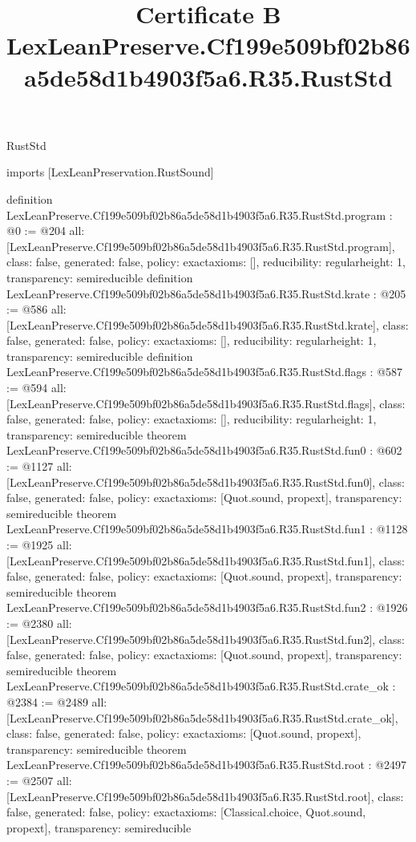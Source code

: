 \begin{lexlean}{RustStd}
\title{Certificate B LexLeanPreserve.Cf199e509bf02b86a5de58d1b4903f5a6.R35.RustStd}
\begin{coremodule}
imports [LexLeanPreservation.RustSound]

definition LexLeanPreserve.Cf199e509bf02b86a5de58d1b4903f5a6.R35.RustStd.program : @0 := @204 {
  all: [LexLeanPreserve.Cf199e509bf02b86a5de58d1b4903f5a6.R35.RustStd.program],
  class: false,
  generated: false,
  policy: exact{axioms: []},
  reducibility: regular{height: 1},
  transparency: semireducible
}
definition LexLeanPreserve.Cf199e509bf02b86a5de58d1b4903f5a6.R35.RustStd.krate : @205 := @586 {
  all: [LexLeanPreserve.Cf199e509bf02b86a5de58d1b4903f5a6.R35.RustStd.krate],
  class: false,
  generated: false,
  policy: exact{axioms: []},
  reducibility: regular{height: 1},
  transparency: semireducible
}
definition LexLeanPreserve.Cf199e509bf02b86a5de58d1b4903f5a6.R35.RustStd.flags : @587 := @594 {
  all: [LexLeanPreserve.Cf199e509bf02b86a5de58d1b4903f5a6.R35.RustStd.flags],
  class: false,
  generated: false,
  policy: exact{axioms: []},
  reducibility: regular{height: 1},
  transparency: semireducible
}
theorem LexLeanPreserve.Cf199e509bf02b86a5de58d1b4903f5a6.R35.RustStd.fun0 : @602 := @1127 {
  all: [LexLeanPreserve.Cf199e509bf02b86a5de58d1b4903f5a6.R35.RustStd.fun0],
  class: false,
  generated: false,
  policy: exact{axioms: [Quot.sound, propext]},
  transparency: semireducible
}
theorem LexLeanPreserve.Cf199e509bf02b86a5de58d1b4903f5a6.R35.RustStd.fun1 : @1128 := @1925 {
  all: [LexLeanPreserve.Cf199e509bf02b86a5de58d1b4903f5a6.R35.RustStd.fun1],
  class: false,
  generated: false,
  policy: exact{axioms: [Quot.sound, propext]},
  transparency: semireducible
}
theorem LexLeanPreserve.Cf199e509bf02b86a5de58d1b4903f5a6.R35.RustStd.fun2 : @1926 := @2380 {
  all: [LexLeanPreserve.Cf199e509bf02b86a5de58d1b4903f5a6.R35.RustStd.fun2],
  class: false,
  generated: false,
  policy: exact{axioms: [Quot.sound, propext]},
  transparency: semireducible
}
theorem LexLeanPreserve.Cf199e509bf02b86a5de58d1b4903f5a6.R35.RustStd.crate_ok : @2384 := @2489 {
  all: [LexLeanPreserve.Cf199e509bf02b86a5de58d1b4903f5a6.R35.RustStd.crate_ok],
  class: false,
  generated: false,
  policy: exact{axioms: [Quot.sound, propext]},
  transparency: semireducible
}
theorem LexLeanPreserve.Cf199e509bf02b86a5de58d1b4903f5a6.R35.RustStd.root : @2497 := @2507 {
  all: [LexLeanPreserve.Cf199e509bf02b86a5de58d1b4903f5a6.R35.RustStd.root],
  class: false,
  generated: false,
  policy: exact{axioms: [Classical.choice, Quot.sound, propext]},
  transparency: semireducible
}


\end{coremodule}
\end{lexlean}
